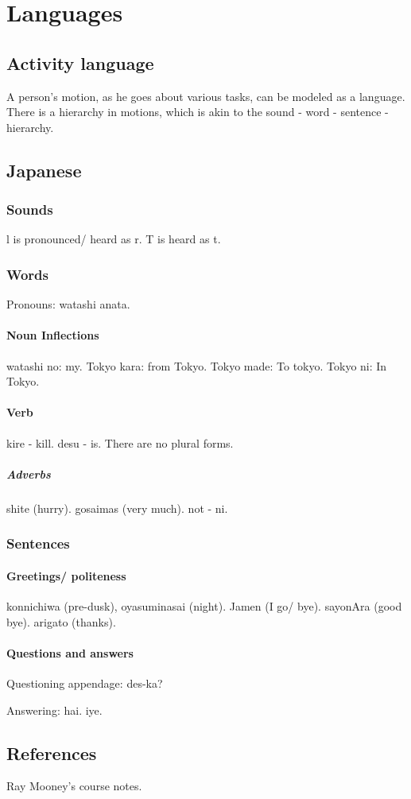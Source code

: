 \documentclass[oneside, article]{memoir}
\begin{document}
\tbc

\part{Languages}
\chapter{Activity language}
A person's motion, as he goes about various tasks, can be modeled as a language. There is a hierarchy in motions, which is akin to the sound - word - sentence - hierarchy.

\chapter{Japanese}
\section{Sounds}
l is pronounced/ heard as r. T is heard as t.

\section{Words}
Pronouns: watashi anata.

\subsection{Noun Inflections}
watashi no: my. Tokyo kara: from Tokyo. Tokyo made: To tokyo. Tokyo ni: In Tokyo.

\subsection{Verb}
kire - kill. desu - is. There are no plural forms.

\subsubsection{Adverbs}
shite (hurry). gosaimas (very much). not - ni.


\section{Sentences}
\subsection{Greetings/ politeness}
konnichiwa (pre-dusk), oyasuminasai (night). Jamen (I go/ bye). 
sayonAra (good bye). arigato (thanks).

\subsection{Questions and answers}
Questioning appendage: des-ka?

Answering: hai. iye.

\chapter{References}
Ray Mooney's course notes.

%
%
\end{document}
